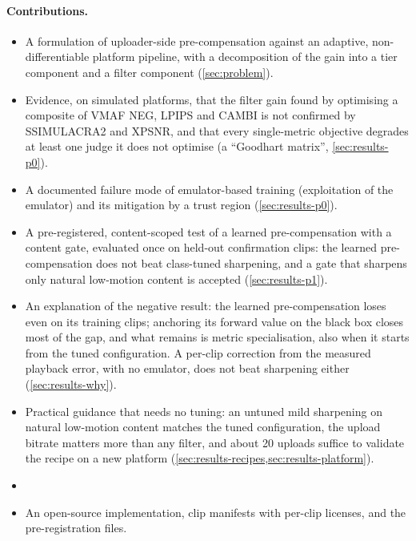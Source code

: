 \paragraph{Contributions.}
\begin{itemize}
  \item A formulation of uploader-side pre-compensation against an adaptive, non-differentiable
        platform pipeline, with a decomposition of the gain into a tier component and a filter
        component (\cref{sec:problem}).
  \item Evidence, on simulated platforms, that the filter gain found by optimising a composite of
        VMAF NEG, LPIPS and CAMBI is not confirmed by SSIMULACRA2 and XPSNR, and that every
        single-metric objective degrades at least one judge it does not optimise (a ``Goodhart
        matrix'', \cref{sec:results-p0}).
  \item A documented failure mode of emulator-based training (exploitation of the emulator) and its
        mitigation by a trust region (\cref{sec:results-p0}).
  \item A pre-registered, content-scoped test of a learned pre-compensation with a content gate,
        evaluated once on held-out confirmation clips: the learned pre-compensation does not beat
        class-tuned sharpening, and a gate that sharpens only natural low-motion content is
        accepted (\cref{sec:results-p1}).
  \item An explanation of the negative result: the learned pre-compensation loses even on its
        training clips; anchoring its forward value on the black box closes most of the gap, and
        what remains is metric specialisation, also when it starts from the tuned configuration. A
        per-clip correction from the measured playback error, with no emulator, does not beat
        sharpening either (\cref{sec:results-why}).
  \item Practical guidance that needs no tuning: an untuned mild sharpening on natural low-motion
        content matches the tuned configuration, the upload bitrate matters more than any filter, and
        about 20 uploads suffice to validate the recipe on a new platform
        (\cref{sec:results-recipes,sec:results-platform}).
  \item {}
  \item An open-source implementation, clip manifests with per-clip licenses, and the
        pre-registration files.
\end{itemize}
